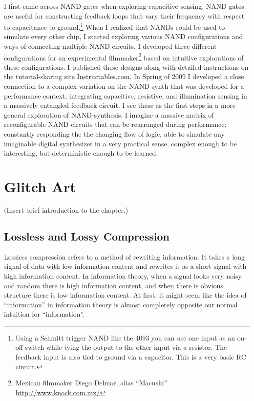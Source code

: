\documentclass{thesis}
\begin{document}
	I first came across NAND gates when exploring capacitive sensing. NAND gates are useful for constructing feedback loops that vary their frequency with respect to capacitance to ground.\footnote{Using a Schmitt trigger NAND like the 4093 you can use one input as an on-off switch while tying the output to the other input via a resistor. The feedback input is also tied to ground via a capacitor. This is a very basic RC circuit.} When I realized that NANDs could be used to simulate every other chip, I started exploring various NAND configurations and ways of connecting multiple NAND circuits. I developed three different configurations for an experimental filmmaker\footnote{Mexican filmmaker Diego Delmar, alias ``Macushi'' \url{http://www.knock.com.mx/}} based on intuitive explorations of these configurations. I published these designs along with detailed instructions on the tutorial-sharing site Instructables.com. In Spring of 2009 I developed a close connection to a complex variation on the NAND-synth that was developed for a performance context, integrating capacitive, resistive, and illumination sensing in a massively entangled feedback circuit. I see these as the first steps in a more general exploration of NAND-synthesis. I imagine a massive matrix of reconfigurable NAND circuits that can be rearranged during performance: constantly responding the the changing flow of logic, able to simulate any imaginable digital synthesizer in a very practical sense, complex enough to be interesting, but deterministic enough to be learned.
	
\chapter{Glitch Art}
(Insert brief introduction to the chapter.)

\section{Lossless and Lossy Compression}
	Lossless compression refers to a method of rewriting information. It takes a long signal of data with low information content and rewrites it as a short signal with high information content. In information theory, when a signal looks very noisy and random there is high information content, and when there is obvious structure there is low information content. At first, it might seem like the idea of ``information'' in information theory is almost completely opposite our normal intuition for ``information''.
	
\end{document}
